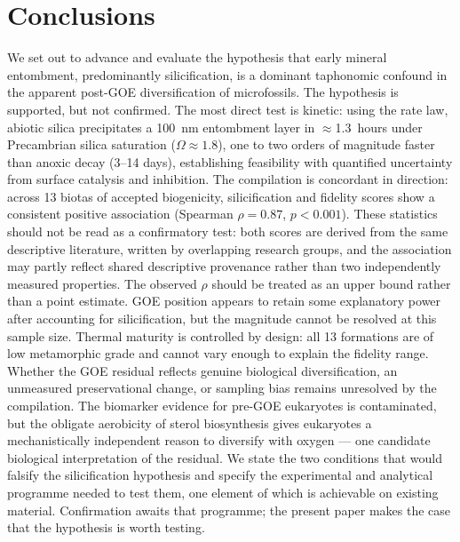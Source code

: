 \documentclass[11pt]{article}
\begin{document}
\section{Conclusions}

We set out to advance and evaluate the hypothesis that early mineral entombment, predominantly
silicification, is a dominant taphonomic confound in the apparent post-GOE diversification of
microfossils. The hypothesis is supported, but not confirmed. The most direct test is kinetic:
using the \citet{Rimstidt1980} rate law, abiotic silica precipitates a 100~nm entombment layer in
$\approx$1.3~hours under Precambrian silica saturation ($\Omega \approx 1.8$), one to two orders of
magnitude faster than anoxic decay (3--14 days), establishing feasibility with quantified uncertainty
from surface catalysis and inhibition. The compilation is concordant in direction: across 13 biotas
of accepted biogenicity, silicification and fidelity scores show a consistent positive association
(Spearman $\rho = 0.87$, $p < 0.001$). These statistics should not be read as a confirmatory test:
both scores are derived from the same descriptive literature, written by overlapping research groups,
and the association may partly reflect shared descriptive provenance rather than two independently
measured properties. The observed $\rho$ should be treated as an upper bound rather than a point
estimate. GOE position appears to retain some explanatory power after accounting for silicification,
but the magnitude cannot be resolved at this sample size. Thermal maturity is controlled by design:
all 13 formations are of low metamorphic grade and cannot vary enough to explain the fidelity range.
Whether the GOE residual reflects genuine biological diversification, an unmeasured preservational
change, or sampling bias remains unresolved by the compilation. The biomarker evidence for pre-GOE
eukaryotes is contaminated, but the obligate aerobicity of sterol biosynthesis gives eukaryotes a
mechanistically independent reason to diversify with oxygen --- one candidate biological interpretation
of the residual. We state the two conditions that would falsify the silicification hypothesis and
specify the experimental and analytical programme needed to test them, one element of which is
achievable on existing material. Confirmation awaits that programme; the present paper makes the case
that the hypothesis is worth testing.
\end{document}
